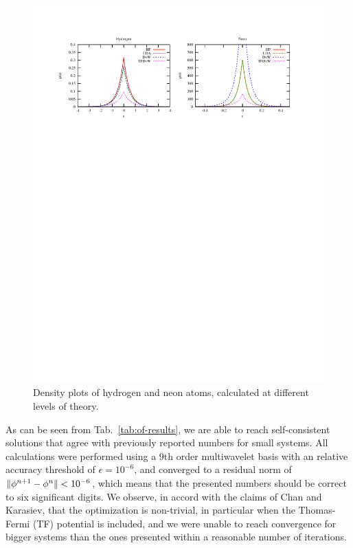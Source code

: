\begin{figure}
    \centering
    \includegraphics[scale=0.7, viewport = 50 560 550 755]{figures/of_atoms.pdf}
    \caption{\footnotesize{Density plots of hydrogen and neon atoms, calculated at different
	levels of theory.}}
    \label{fig:of-atoms}
\end{figure}

As can be seen from Tab.~\ref{tab:of-results}, we are able to reach self-consistent solutions that agree 
with previously reported numbers for small systems. All calculations were performed using a 9th order 
multiwavelet basis with an relative accuracy threshold of $\epsilon=10^{-6}$, and converged to a residual norm 
of $\|\phi^{n+1}-\phi^n\| < 10^{-6}$, which means that the presented numbers should be correct to
six significant digits. We observe, in accord with the claims of Chan and Karasiev, that the optimization is 
non-trivial, in particular when the Thomas-Fermi (TF) potential is included, and we were unable to reach convergence 
for bigger systems than the ones presented within a reasonable number of iterations. 

